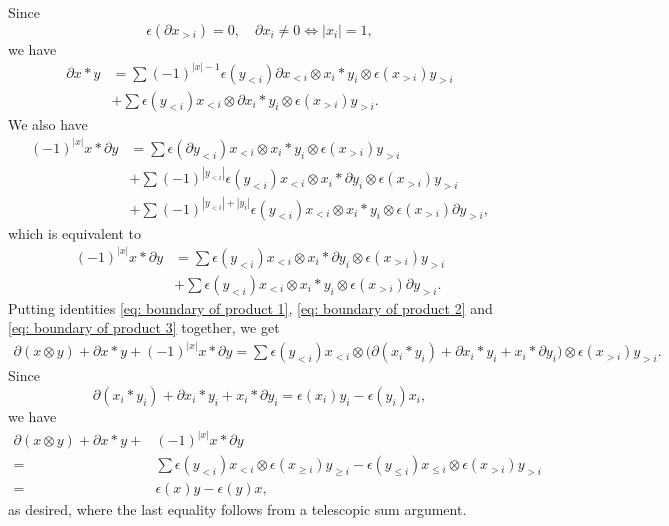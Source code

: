 \documentclass[A4]{amsart}
\theoremstyle{definition}
\begin{document}
Since
\begin{equation*}
\epsilon(\partial x_{>i}) = 0, \quad \partial x_i \neq 0 \Leftrightarrow |x_i| = 1,
\end{equation*}
we have
\begin{equation} \label{eq: boundary of product 2}
\begin{split}
\partial x \ast y & = 
\sum (-1)^{|x|-1} \epsilon(y_{<i}) \partial x_{<i} \otimes x_i \ast y_i \otimes \epsilon(x_{>i}) y_{>i} \\ & +
\sum \epsilon(y_{<i}) x_{<i} \otimes \partial x_i \ast y_i \otimes \epsilon(x_{>i}) y_{>i}.
\end{split}
\end{equation}
We also have
\begin{align*}
(-1)^{|x|} x \ast \partial y & = 
\sum \epsilon(\partial y_{<i}) x_{<i} \otimes x_i \ast y_i \otimes \epsilon(x_{>i}) y_{>i} \\ & +
\sum (-1)^{|y_{<i}|} \epsilon(y_{<i}) x_{<i} \otimes x_i \ast \partial y_i \otimes \epsilon(x_{>i}) y_{>i} \\ & +
\sum (-1)^{|y_{<i}|+|y_i|} \epsilon(y_{<i}) x_{<i} \otimes x_i \ast y_i \otimes \epsilon(x_{>i}) \partial y_{>i},
\end{align*}
which is equivalent to
\begin{equation} \label{eq: boundary of product 3}
\begin{split}
(-1)^{|x|} x \ast \partial y & = 
\sum \epsilon(y_{<i}) x_{<i} \otimes x_i \ast \partial y_i \otimes \epsilon(x_{>i}) y_{>i} \\ & +
\sum \epsilon(y_{<i}) x_{<i} \otimes x_i \ast y_i \otimes \epsilon(x_{>i}) \partial y_{>i}.
\end{split}
\end{equation}
Putting identities \eqref{eq: boundary of product 1}, \eqref{eq: boundary of product 2} and \eqref{eq: boundary of product 3} together, we get
\begin{multline*}
\partial (x \otimes y) + \partial x \ast y + (-1)^{|x|}x \ast \partial y =
\sum \epsilon(y_{<i}) x_{<i} \otimes \big(\partial(x_i \ast y_i) + \partial x_i \ast y_i + x_i \ast \partial y_i\big) \otimes \epsilon(x_{>i}) y_{>i}.
\end{multline*}
Since
\begin{equation*}
\partial(x_i \ast y_i) + \partial x_i \ast y_i + x_i \ast \partial y_i = \epsilon(x_i)y_i - \epsilon(y_i)x_i,
\end{equation*}
we have
\begin{align*}
\partial (x \otimes y) + \partial x \ast y + & (-1)^{|x|}x \ast \partial y \\ = &
\sum \epsilon(y_{<i}) x_{<i} \otimes \epsilon(x_{\geq i}) y_{\geq i} - \epsilon(y_{\leq i}) x_{\leq i} \otimes \epsilon(x_{>i}) y_{>i} \\ = &
\epsilon(x)y - \epsilon(y)x,
\end{align*}
as desired, where the last equality follows from a telescopic sum argument.

 

	
\end{document}
